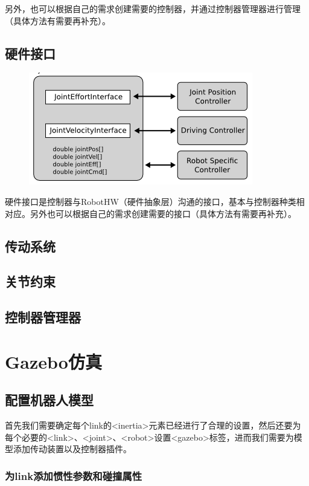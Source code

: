 \documentclass[9pt, oneside]{book}
\begin{document}
另外，也可以根据自己的需求创建需要的控制器，并通过控制器管理器进行管理（具体方法有需要再补充）。

\subsection{硬件接口}

\begin{figure}[H]
    \centering
    \includegraphics[width=0.4\linewidth]{image/硬件接口.png}
\end{figure}

硬件接口是控制器与RobotHW（硬件抽象层）沟通的接口，基本与控制器种类相对应。另外也可以根据自己的需求创建需要的接口（具体方法有需要再补充）。

\subsection{传动系统}

\subsection{关节约束}

\subsection{控制器管理器}

\section{Gazebo仿真}

\subsection{配置机器人模型}

首先我们需要确定每个link的<inertia>元素已经进行了合理的设置，然后还要为每个必要的<link>、<joint>、<robot>设置<gazebo>标签，进而我们需要为模型添加传动装置以及控制器插件。

\subsubsection{为link添加惯性参数和碰撞属性}
\end{document}
